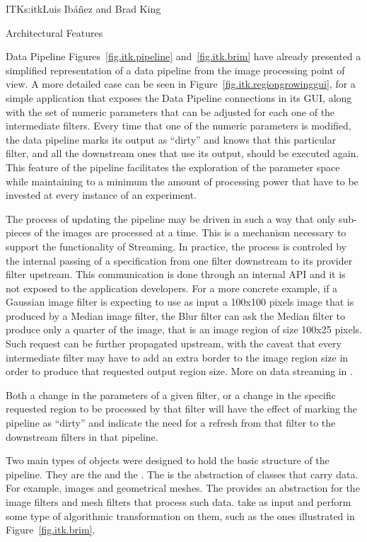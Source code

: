 \begin{aosachapter}{ITK}{s:itk}{Luis Ib\'{a}\~{n}ez and Brad King}
\begin{aosasect1}{Architectural Features}
\begin{aosasect2}{Data Pipeline}
Figures~\ref{fig.itk.pipeline} and~\ref{fig.itk.brim} have already presented a
simplified representation of a data pipeline from the image processing point of
view. A more detailed case can be seen in
Figure~\ref{fig.itk.regiongrowinggui}, for a simple application that exposes
the Data Pipeline connections in its GUI, along with the set of numeric
parameters that can be adjusted for each one of the intermediate filters. Every
time that one of the numeric parameters is modified, the data pipeline marks
its output as ``dirty'' and knows that this particular filter, and all the
downstream ones that use its output, should be executed again. This feature of
the pipeline facilitates the exploration of the parameter space while
maintaining to a minimum the amount of processing power that have to be
invested at every instance of an experiment.

The process of updating the pipeline may be driven in such a way that only
sub-pieces of the images are processed at a time. This is a mechanism necessary
to support the functionality of Streaming. In practice, the process is
controled by the internal passing of a  specification
from one filter downstream to its provider filter upstream. This communication
is done through an internal API and it is not exposed to the application
developers. For a more concrete example, if a Gaussian image filter is
expecting to use as input a 100x100 pixels image that is produced by a Median
image filter, the Blur filter can ask the Median filter to produce only a
quarter of the image, that is an image region of size 100x25 pixels.  Such
request can be further propagated upstream, with the caveat that every
intermediate filter may have to add an extra border to the image region size in
order to produce that requested output region size.
More on data streaming in .

Both a change in the parameters of a given filter, or a change in the
specific requested region to be processed by that filter will have the
effect of marking the pipeline as ``dirty'' and indicate the need for
a refresh from that filter to the downstream filters in that pipeline.

Two main types of objects were designed to hold the basic structure of the
pipeline.  They are the  and the . The
 is the abstraction of classes that carry data. For example,
images and geometrical meshes. The  provides an abstraction
for the image filters and mesh filters that process such data.
 take  as input and perform some type of
algorithmic transformation on them, such as the ones illustrated in
Figure~\ref{fig.itk.brim}.


\end{aosasect2}
\end{aosasect1}
\end{aosachapter}
